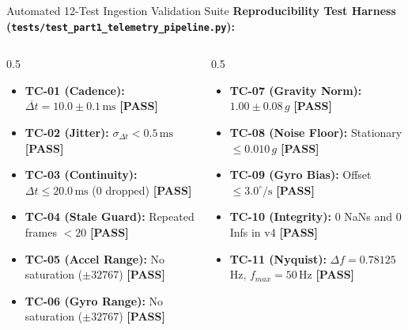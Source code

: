 \documentclass[aspectratio=169, 10pt]{beamer}
\begin{document}
\begin{frame}{Automated 12-Test Ingestion Validation Suite}
    \textbf{Reproducibility Test Harness (\texttt{tests/test\_part1\_telemetry\_pipeline.py}):}
    \begin{columns}[T]
        \begin{column}{0.5\textwidth}
            \begin{itemize}
                \item \textbf{TC-01 (Cadence):} $\overline{\Delta t} = 10.0 \pm 0.1\,\text{ms}$ \hfill \textcolor{tealgreen}{\textbf{[PASS]}}
                \item \textbf{TC-02 (Jitter):} $\sigma_{\Delta t} < 0.5\,\text{ms}$ \hfill \textcolor{tealgreen}{\textbf{[PASS]}}
                \item \textbf{TC-03 (Continuity):} $\Delta t \le 20.0\,\text{ms}$ (0 dropped) \hfill \textcolor{tealgreen}{\textbf{[PASS]}}
                \item \textbf{TC-04 (Stale Guard):} Repeated frames $< 20$ \hfill \textcolor{tealgreen}{\textbf{[PASS]}}
                \item \textbf{TC-05 (Accel Range):} No saturation ($\pm 32767$) \hfill \textcolor{tealgreen}{\textbf{[PASS]}}
                \item \textbf{TC-06 (Gyro Range):} No saturation ($\pm 32767$) \hfill \textcolor{tealgreen}{\textbf{[PASS]}}
            \end{itemize}
        \end{column}
        \begin{column}{0.5\textwidth}
            \begin{itemize}
                \item \textbf{TC-07 (Gravity Norm):} $1.00 \pm 0.08\,g$ \hfill \textcolor{tealgreen}{\textbf{[PASS]}}
                \item \textbf{TC-08 (Noise Floor):} Stationary $\le 0.010\,g$ \hfill \textcolor{tealgreen}{\textbf{[PASS]}}
                \item \textbf{TC-09 (Gyro Bias):} Offset $\le 3.0^\circ/\text{s}$ \hfill \textcolor{tealgreen}{\textbf{[PASS]}}
                \item \textbf{TC-10 (Integrity):} 0 NaNs and 0 Infs in v4 \hfill \textcolor{tealgreen}{\textbf{[PASS]}}
                \item \textbf{TC-11 (Nyquist):} $\Delta f = 0.78125$\,Hz, $f_{max} = 50$\,Hz \hfill \textcolor{tealgreen}{\textbf{[PASS]}}

\end{itemize}
\end{column}
\end{columns}
\end{frame}
\end{document}
